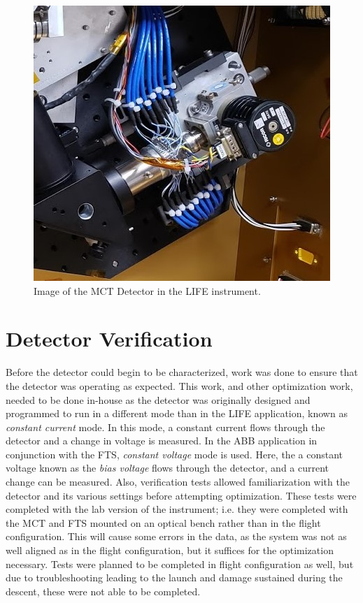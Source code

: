 \begin{figure}[h]
  \centering
  \includegraphics[width=0.6\linewidth]{chap5_images/detector_in_LIFE.jpg}
  \caption{Image of the MCT Detector in the LIFE instrument.}
  \label{fig:life_detector_from_ICD}
\end{figure}

\section{Detector Verification}\label{detector_verif}
Before the detector could begin to be characterized, work was done to ensure that the detector was operating as expected. This work, and other optimization work, needed to be done in-house as the detector was originally designed and programmed to run in a different mode than in the LIFE application, known as \textit{constant current} mode. In this mode, a constant current flows through the detector and a change in voltage is measured. In the ABB application in conjunction with the FTS, \textit{constant voltage} mode is used. Here, the a constant voltage known as the \textit{bias voltage} flows through the detector, and a current change can be measured. Also, verification tests allowed familiarization with the detector and its various settings before attempting optimization. These tests were completed with the lab version of the instrument; i.e. they were completed with the MCT and FTS mounted on an optical bench rather than in the flight configuration. This will cause some errors in the data, as the system was not as well aligned as in the flight configuration, but it suffices for the optimization necessary. Tests were planned to be completed in flight configuration as well, but due to troubleshooting leading to the launch and damage sustained during the descent, these were not able to be completed.

